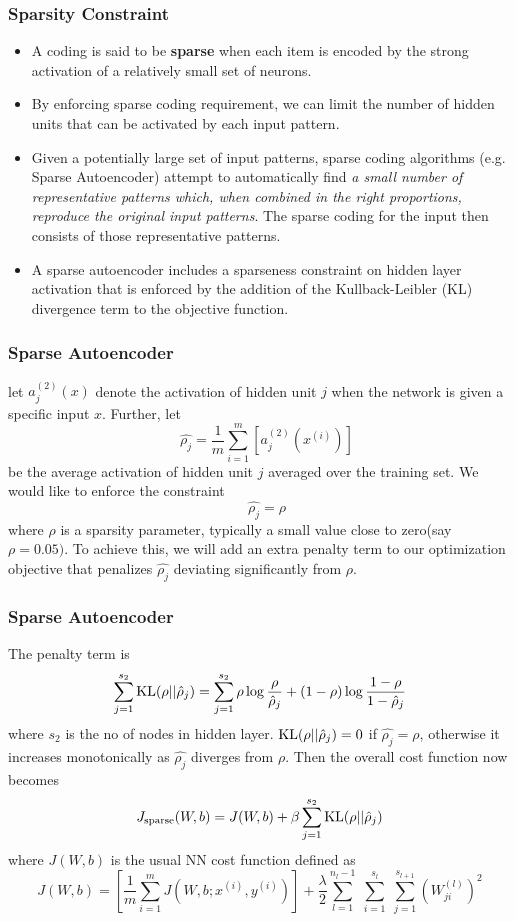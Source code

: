 \documentclass{beamer}
\begin{document}
\begin{frame}
\frametitle{Sparsity Constraint}
\begin{itemize}
\item A coding is said to be \textbf{sparse} when each item is encoded by the strong activation of a relatively small set of neurons.
\item By enforcing sparse coding requirement, we can limit the number of hidden units that can be activated by each input pattern.
\item Given a potentially large set of input patterns, sparse coding algorithms (e.g. Sparse Autoencoder) attempt to automatically find \textit{a small number of representative patterns which, when combined in the right proportions, reproduce the original input patterns}. The sparse coding for the input then consists of those representative patterns.
\item A sparse autoencoder includes a sparseness constraint on hidden layer activation that is enforced by the addition of the Kullback-Leibler (KL) divergence term to the objective function.
\end{itemize}
\end{frame}

\begin{frame}
\frametitle{Sparse Autoencoder}
let $\textstyle{a^{(2)}_j(x)}$ denote the activation of  hidden unit $\textstyle{j}$ when the network is given a specific input $\textstyle{x}$. Further, let 
\[\quad \hat{ \rho_j }= \frac{1}{m} \sum_{i=1}^m \left[ a^{(2)}_j(x^{(i)}) \right] \]
be the average activation of hidden unit $\textstyle{j}$ averaged over the training set. We would like to enforce the constraint
\[ \quad \hat{\rho_j}= \rho \]
where $\textstyle{\rho}$ is a sparsity parameter, typically a small value close to zero(say $\textstyle{\rho = 0.05)}$. To achieve this, we will add an extra penalty term to our optimization objective that penalizes $\textstyle{\hat{\rho_j}}$ deviating significantly from $\textstyle{\rho}$. 
\end{frame}

\begin{frame}
\frametitle{Sparse Autoencoder}
The penalty term is 
\[ \sum_{j=1}^{s_2} {\rm KL}(\rho || \hat\rho_j) = \sum_{j=1}^{s_2} \rho \log \frac{\rho}{\hat\rho_j}
 + (1-\rho) \log \frac{1-\rho}{1-\hat\rho_j} \]
 where $s_2$ is the no of nodes in hidden layer. $\textstyle{{\rm KL}(\rho || \hat\rho_j)=0}$ if $\textstyle{\hat{\rho_j} = \rho}$, otherwise it increases monotonically as $\textstyle{\hat{\rho_j}}$ diverges from $\textstyle{\rho}$. Then the overall cost function now becomes
 \[J_{\rm sparse}(W,b) = J(W,b) + \beta \sum_{j=1}^{s_2} {\rm KL}(\rho || \hat\rho_j)\]
 where $\textstyle{J(W,b)}$ is the usual NN cost function defined as
\[ J(W,b) = \left[ \frac{1}{m} \sum_{i=1}^m J(W,b;x^{(i)},y^{(i)}) \right]
                       + \frac{\lambda}{2} \sum_{l=1}^{n_l-1} \; \sum_{i=1}^{s_l} \; \sum_{j=1}^{s_{l+1}} \left( W^{(l)}_{ji} \right)^2 \]
 
\end{frame}
\end{document}
